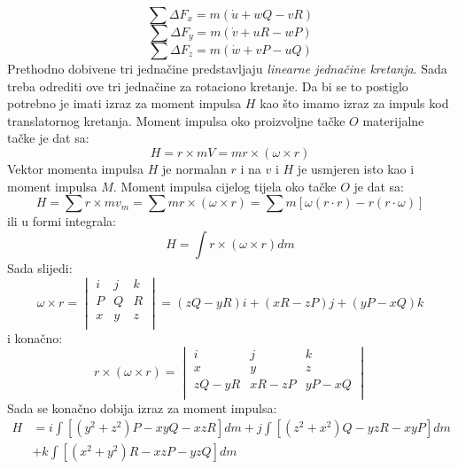 \begin{equation}
    \sum \Delta F_x=m(\dot{u}+wQ-vR)
    \label{eq:r1}
\end{equation}
\begin{equation}
    \sum \Delta F_y=m(\dot{v}+uR-wP)
    \label{eq:r2}
\end{equation}
\begin{equation}
    \sum \Delta F_z=m(\dot{w}+vP-uQ)
    \label{eq:r3}
\end{equation}
Prethodno dobivene tri jednačine predstavljaju \textit{linearne jednačine kretanja}. Sada treba odrediti 
ove tri jednačine za rotaciono kretanje. Da bi se to postiglo potrebno je imati izraz za 
moment impulsa $H$ kao što imamo izraz za impuls kod translatornog kretanja. Moment impulsa oko 
proizvoljne tačke $O$ materijalne tačke je dat sa:
\begin{equation}
    H=r\times mV=mr\times (\omega \times r)
\end{equation}
Vektor momenta impulsa $H$ je normalan $r$ i na $v$ i $H$ je usmjeren isto kao i moment impulsa $M$.
Moment impulsa cijelog tijela oko tačke $O$ je dat sa:
\begin{equation}
    H=\sum r\times mv_m=\sum mr\times (\omega \times r)=\sum m\left[\omega(r\cdot r )-r(r\cdot \omega) \right]
\end{equation}
ili u formi integrala:
\begin{equation}
    H=\int r\times (\omega \times r)dm
\end{equation}
Sada slijedi:
\begin{equation}
    \omega \times r=\begin{vmatrix}
        i&j&k\\
        P&Q&R\\
        x&y&z\\
    \end{vmatrix}=(zQ-yR)i+(xR-zP)j+(yP-xQ)k
\end{equation}
 i konačno:
 \begin{equation}
    r\times (\omega \times r)=\begin{vmatrix}
        i&j&k\\
        x&y&z\\
        zQ-yR&xR-zP&yP-xQ\\
    \end{vmatrix}
 \end{equation}
 Sada se konačno dobija izraz za moment impulsa:
 \begin{equation}
    \begin{split}      
     H&=i\int \left[ (y^2+z^2)P -xyQ -xzR \right]dm+j\int\left[ (z^2+x^2)Q-yzR-xyP \right]dm\\ 
     &+k\int \left[ (x^2+y^2)R-xzP-yzQ \right]dm    
    \end{split}
    \end{equation}

